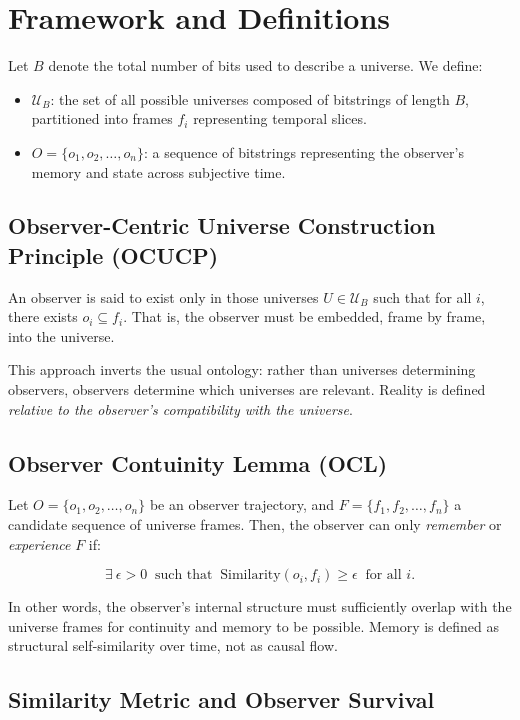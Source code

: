 \documentclass[12pt]{article}
\begin{document}
\section{Framework and Definitions}

Let $B$ denote the total number of bits used to describe a universe. We define:

\begin{itemize}
    \item $\mathcal{U}_B$: the set of all possible universes composed of bitstrings of length $B$, partitioned into frames $f_i$ representing temporal slices.
    \item $O = \{o_1, o_2, \ldots, o_n\}$: a sequence of bitstrings representing the observer's memory and state across subjective time.
\end{itemize}

\subsection{Observer-Centric Universe Construction Principle (OCUCP)}

An observer is said to exist only in those universes $U \in \mathcal{U}_B$ such that for all $i$, there exists $o_i \subseteq f_i$. That is, the observer must be embedded, frame by frame, into the universe.

This approach inverts the usual ontology: rather than universes determining observers, observers determine which universes are relevant. Reality is defined \emph{relative to the observer's compatibility with the universe}.

\subsection{Observer Contuinity Lemma (OCL)}

Let $O = \{o_1, o_2, \ldots, o_n\}$ be an observer trajectory, and $F = \{f_1, f_2, \ldots, f_n\}$ a candidate sequence of universe frames. Then, the observer can only \emph{remember} or \emph{experience} $F$ if:

\[
    \exists\ \epsilon > 0\ \text{ such that }\ \text{Similarity}(o_i, f_i) \ge \epsilon\ \text{ for all } i.
\]

In other words, the observer's internal structure must sufficiently overlap with the universe frames for continuity and memory to be possible. Memory is defined as structural self-similarity over time, not as causal flow.

\subsection{Similarity Metric and Observer Survival}
\end{document}

